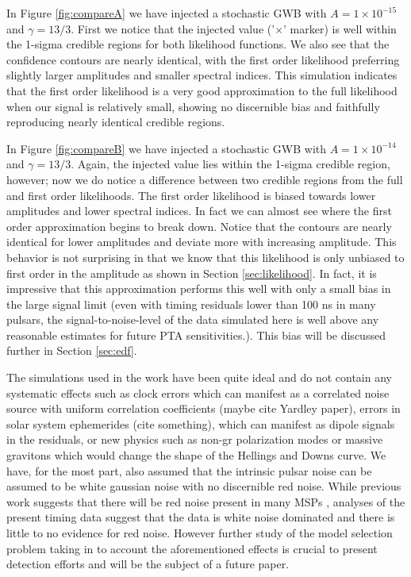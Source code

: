 \documentclass[iop]{emulateapj}
\begin{document}
 In Figure \ref{fig:compareA} we have injected a stochastic GWB with $A=1\times 10^{-15}$ and $\gamma=13/3$. First we notice that the injected value ('$\times$' marker) is well within the 1-sigma credible regions for both likelihood functions. We also see that the confidence contours are nearly identical, with the first order likelihood preferring slightly larger amplitudes and smaller spectral indices. This simulation indicates that the first order likelihood is a very good approximation to the full likelihood when our signal is relatively small, showing no discernible bias and faithfully reproducing nearly identical credible regions. 
 
 In Figure \ref{fig:compareB} we have injected a stochastic GWB with $A=1\times 10^{-14}$ and $\gamma=13/3$. Again, the injected value lies within the 1-sigma credible region, however; now we do notice a difference between two credible regions from the full and first order likelihoods. The first order likelihood is biased towards lower amplitudes and lower spectral indices. In fact we can almost see where the first order approximation begins to break down. Notice that the contours are nearly identical for lower amplitudes and deviate more with increasing amplitude. This behavior is not surprising in that we know that this likelihood is only unbiased to first order in the amplitude as shown in Section \ref{sec:likelihood}. In fact, it is impressive that this approximation performs this well with only a small bias in the large signal limit (even with timing residuals lower than 100 ns in many pulsars, the signal-to-noise-level of the data simulated here is well above any reasonable estimates for future PTA sensitivities.). This bias will be discussed further in Section \ref{sec:edf}.
 
 The simulations used in the work have been quite ideal and do not contain any systematic effects such as clock errors which can manifest as a correlated noise source with uniform correlation coefficients (maybe cite Yardley paper), errors in solar system ephemerides (cite something), which can manifest as dipole signals in the residuals, or new physics such as non-gr polarization modes \citep{ljp08,ss12} or massive gravitons \citep{ljp+10} which would change the shape of the Hellings and Downs curve. We have, for the most part, also assumed that the intrinsic pulsar noise can be assumed to be white gaussian noise with no discernible red noise. While previous work suggests that there will be red noise present in many MSPs \citep{sc10}, analyses of the present timing data \citep{vhj+11,delphine,esd+12} suggest that the data is white noise dominated and there is little to no evidence for red noise. However further study of the model selection problem taking in to account the aforementioned effects is crucial to present detection efforts and will be the subject of a future paper.
 
\end{document}

